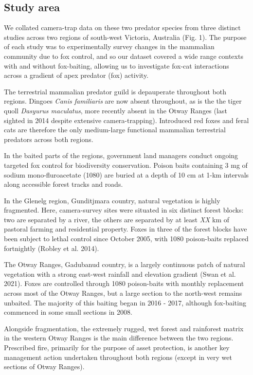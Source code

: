\documentclass[]{elsarticle} %
\begin{document}
\hypertarget{study-area}{%
\subsection{Study area}\label{study-area}}

We collated camera-trap data on these two predator species from three distinct studies across two regions of south-west Victoria, Australia (Fig. 1). The purpose of each study was to experimentally survey changes in the mammalian community due to fox control, and so our dataset covered a wide range contexts with and without fox-baiting, allowing us to investigate fox-cat interactions across a gradient of apex predator (fox) activity.

The terrestrial mammalian predator guild is depauperate throughout both regions. Dingoes \emph{Canis familiaris} are now absent throughout, as is the the tiger quoll \emph{Dasyurus maculatus}, more recently absent in the Otway Ranges (last sighted in 2014 despite extensive camera-trapping). Introduced red foxes and feral cats are therefore the only medium-large functional mammalian terrestrial predators across both regions.

In the baited parts of the regions, government land managers conduct ongoing targeted fox control for biodiversity conservation. Poison baits containing 3 mg of sodium mono-fluroacetate (1080) are buried at a depth of 10 cm at 1-km intervals along accessible forest tracks and roads.

In the Glenelg region, Gunditjmara country, natural vegetation is highly fragmented. Here, camera-survey sites were situated in six distinct forest blocks: two are separated by a river, the others are separated by at least \emph{XX} km of pastoral farming and residential property. Foxes in three of the forest blocks have been subject to lethal control since October 2005, with 1080 poison-baits replaced fortnightly (Robley et al. 2014).

The Otway Ranges, Gadubanud country, is a largely continuous patch of natural vegetation with a strong east-west rainfall and elevation gradient (Swan et al. 2021). Foxes are controlled through 1080 poison-baits with monthly replacement across most of the Otway Ranges, but a large section to the north-west remains unbaited. The majority of this baiting began in 2016 - 2017, although fox-baiting commenced in some small sections in 2008.

Alongside fragmentation, the extremely rugged, wet forest and rainforest matrix in the western Otway Ranges is the main difference between the two regions. Prescribed fire, primarily for the purpose of asset protection, is another key management action undertaken throughout both regions (except in very wet sections of Otway Ranges).
\end{document}

